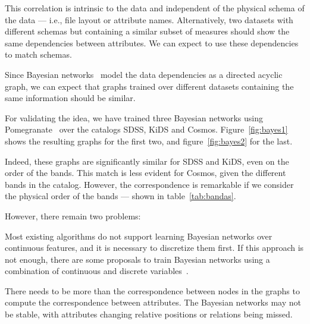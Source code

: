 This correlation is intrinsic to the data and independent of the physical
schema of the data --- i.e., file layout or attribute names. Alternatively,
two datasets with different schemas but containing a similar subset of
measures should show the same dependencies between attributes. We can
expect to use these dependencies to match schemas\footnotemark.


Since Bayesian networks~\cite{pearl1988}  model the data dependencies
as a directed acyclic graph, we can expect that graphs trained over different
datasets containing the same information should be similar.

For validating the idea, we have trained three Bayesian networks using Pomegranate~\cite{schreiber2018pomegranate} over the catalogs
\gls{SDSS}, \gls{KiDS} and \gls{Cosmos}. Figure~\ref{fig:bayes1} shows the
resulting graphs for the first two, and figure~\ref{fig:bayes2} for the last.

Indeed, these graphs are significantly similar for \gls{SDSS} and \gls{KiDS},
even on the order of the bands. This match is less evident for \gls{Cosmos},
given the different bands in the catalog. However, the correspondence is
remarkable if we consider the physical order of the bands --- shown in table~\ref{tab:bandas}.

However, there remain two problems:

Most existing algorithms do not support learning Bayesian networks over continuous features,
and it is necessary to discretize them first. If this approach is not enough, there are some
proposals to train Bayesian networks using a combination of continuous and discrete
variables~\cite{Lucas2015,chen2017}.

There needs to be more than the correspondence between nodes in the graphs to compute
the correspondence between attributes. The Bayesian networks may not be stable, with
attributes changing relative positions or relations being missed.

